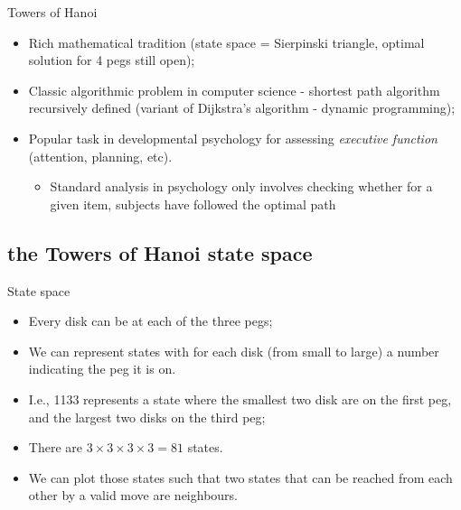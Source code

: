 \documentclass[xcolor=table]{beamer}
\begin{document}
\begin{frame}{Towers of Hanoi}
  \begin{itemize}
  \item Rich mathematical tradition (state space = \alert{Sierpinski triangle}, optimal solution for 4 pegs still open);
  \item Classic algorithmic problem in computer science - shortest path algorithm recursively defined (variant of \alert{Dijkstra's algorithm} - dynamic programming);
  \item Popular task in \alert{developmental psychology} for assessing \emph{executive function} (attention, planning, etc).
    \begin{itemize}
    \item Standard analysis in psychology only involves checking whether for a given item, subjects have followed the optimal path
    \end{itemize}
  \end{itemize}
\end{frame}

\subsection{the Towers of Hanoi state space}

\begin{frame}{State space}
  \begin{itemize}[<+->]
  \item Every disk can be at each of the three pegs;
  \item We can represent states with for each disk (from small to large) a number indicating the peg it is on.
  \item I.e., 1133 represents a state where the smallest two disk are on the first peg, and the largest two disks on the third peg;
  \item There are $3\times3\times3\times3=81$ states.
  \item We can plot those states such that two states that can be reached from each other by a valid move are neighbours.
  \end{itemize}
\end{frame}
\end{document}

